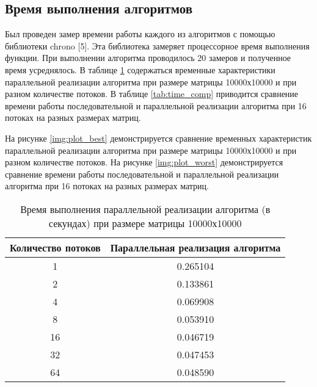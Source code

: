 \clearpage

\subsection{Время выполнения алгоритмов}

Был проведен замер времени работы каждого из алгоритмов с помощью библиотеки chrono [5]. Эта библиотека замеряет процессорное время выполнения функции. При выполнении алгоритма проводилось 20 замеров и полученное время усреднялось. В таблице \ref{tab:time_threads} содержаться временные характеристики параллельной реализации алгоритма при размере матрицы 10000х10000 и при разном количестве потоков. В таблице \ref{tab:time_comp} приводится сравнение времени работы последовательной и параллельной реализации алгоритма при 16 потоках на разных размерах матриц.

На рисунке \ref{img:plot_best} демонстрируется сравнение временных характеристик параллельной реализации алгоритма при размере матрицы 10000х10000 и при разном количестве потоков. На рисунке \ref{img:plot_worst} демонстрируется сравнение времени работы последовательной и параллельной реализации алгоритма при 16 потоках на разных размерах матриц. \\

\begin{table}[ht]
    \caption{\centering Время выполнения параллельной реализации алгоритма (в секундах) при размере матрицы 10000х10000}
    \centering
    \begin{tabular}{|c|c|}
    \hline
    Количество потоков & Параллельная реализация алгоритма \\ \hline
    1     & 0.265104      \\ \hline
    2     & 0.133861      \\ \hline
    4     & 0.069908      \\ \hline
    8     & 0.053910      \\ \hline
    16    & 0.046719      \\ \hline
    32    & 0.047453      \\ \hline
    64    & 0.048590      \\ \hline
    \end{tabular}
    \label{tab:time_threads}
\end{table}

